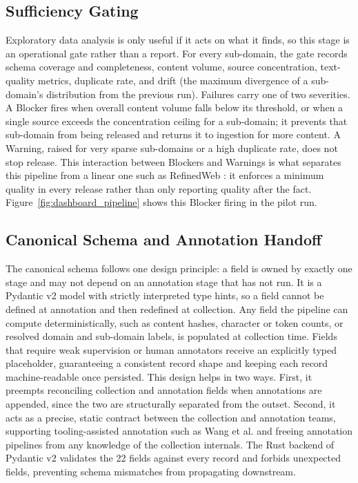 \documentclass[conference]{IEEEtran}
\begin{document}
\subsection{Sufficiency Gating}

Exploratory data analysis is only useful if it acts on what it finds, so this stage is an operational gate rather than a report. For every sub-domain, the gate records schema coverage and completeness, content volume, source concentration, text-quality metrics, duplicate rate, and drift (the maximum divergence of a sub-domain's distribution from the previous run). Failures carry one of two severities. A Blocker fires when overall content volume falls below its threshold, or when a single source exceeds the concentration ceiling for a sub-domain; it prevents that sub-domain from being released and returns it to ingestion for more content. A Warning, raised for very sparse sub-domains or a high duplicate rate, does not stop release. This interaction between Blockers and Warnings is what separates this pipeline from a linear one such as RefinedWeb \cite{penedo2023refinedweb}: it enforces a minimum quality in every release rather than only reporting quality after the fact. Figure~\ref{fig:dashboard_pipeline} shows this Blocker firing in the pilot run.

\subsection{Canonical Schema and Annotation Handoff}

The canonical schema follows one design principle: a field is owned by exactly one stage and may not depend on an annotation stage that has not run. It is a Pydantic v2 model \cite{pydanticv2} with strictly interpreted type hints, so a field cannot be defined at annotation and then redefined at collection. Any field the pipeline can compute deterministically, such as content hashes, character or token counts, or resolved domain and sub-domain labels, is populated at collection time. Fields that require weak supervision or human annotators receive an explicitly typed placeholder, guaranteeing a consistent record shape and keeping each record machine-readable once persisted. This design helps in two ways. First, it preempts reconciling collection and annotation fields when annotations are appended, since the two are structurally separated from the outset. Second, it acts as a precise, static contract between the collection and annotation teams, supporting tooling-assisted annotation such as Wang et al. \cite{wang2023selfinstruct} and freeing annotation pipelines from any knowledge of the collection internals. The Rust backend of Pydantic v2 \cite{pydanticv2} validates the 22 fields against every record and forbids unexpected fields, preventing schema mismatches from propagating downstream.
\end{document}
